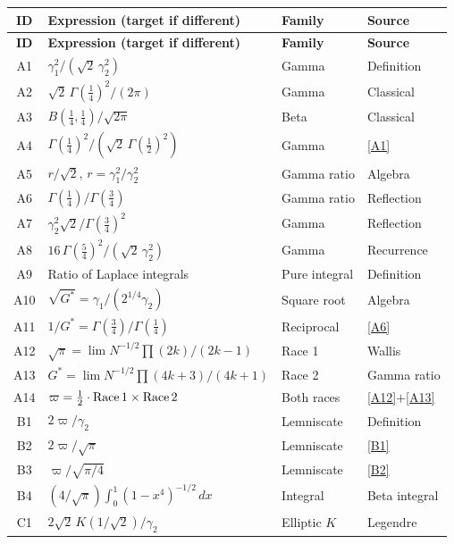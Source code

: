 \documentclass[12pt,reqno]{amsart}
\theoremstyle{definition}
\theoremstyle{remark}
\newcommand{\Gstar}{G^{\!*}}
\newcommand{\varpiup}{\varpi}
\begin{document}
\begin{center}
\begin{longtable}{clll}
\toprule
\textbf{ID} & \textbf{Expression (target if different)} & \textbf{Family} & \textbf{Source} \\
\midrule
\endfirsthead
\toprule
\textbf{ID} & \textbf{Expression (target if different)} & \textbf{Family} & \textbf{Source} \\
\midrule
\endhead
A1 & $\gamma_{1}^{2}/(\sqrt{2}\,\gamma_{2}^{2})$ & Gamma & Definition \\
A2 & $\sqrt{2}\,\Gamma(\frac14)^{2}/(2\pi)$ & Gamma & Classical \\
A3 & $B(\frac14,\frac14)/\sqrt{2\pi}$ & Beta & Classical \\
A4 & $\Gamma(\frac14)^{2}/(\sqrt{2}\,\Gamma(\frac12)^{2})$ & Gamma & \eqref{A1} \\
A5 & $r/\sqrt{2}$, \; $r=\gamma_1^2/\gamma_2^2$ & Gamma ratio & Algebra \\
A6 & $\Gamma(\frac14)/\Gamma(\frac34)$ & Gamma ratio & Reflection \\
A7 & $\gamma_2^2\sqrt{2}/\Gamma(\frac34)^2$ & Gamma & Reflection \\
A8 & $16\,\Gamma(\frac54)^2/(\sqrt{2}\,\gamma_2^2)$ & Gamma & Recurrence \\
A9 & Ratio of Laplace integrals & Pure integral & Definition \\
A10 & $\sqrt{{\Gstar}}=\gamma_1/(2^{1/4}\gamma_2)$ & Square root & Algebra \\
A11 & $1/{\Gstar}=\Gamma(\frac34)/\Gamma(\frac14)$ & Reciprocal & \eqref{A6} \\
A12 & $\sqrt\pi = \lim N^{-1/2}\prod(2k)/(2k{-}1)$ & Race 1 & Wallis~\cite{Wallis} \\
A13 & ${\Gstar} = \lim N^{-1/2}\prod(4k{+}3)/(4k{+}1)$ & Race 2 & Gamma ratio \\
A14 & $\varpiup = \tfrac12\cdot\text{Race\,1}\times\text{Race\,2}$ & Both races & \eqref{A12}$+$\eqref{A13} \\
\midrule
B1 & $2\varpiup/\gamma_{2}$ & Lemniscate & Definition \\
B2 & $2\varpiup/\sqrt{\pi}$ & Lemniscate & \eqref{B1} \\
B3 & $\varpiup/\sqrt{\pi/4}$ & Lemniscate & \eqref{B2} \\
B4 & $(4/\sqrt{\pi})\int_{0}^{1}(1-x^{4})^{-1/2}\,dx$ & Integral & Beta integral \\
\midrule
C1 & $2\sqrt{2}\,K(1/\!\sqrt{2})/\gamma_{2}$ & Elliptic $K$ & Legendre \\

\end{longtable}
\end{center}
\end{document}
